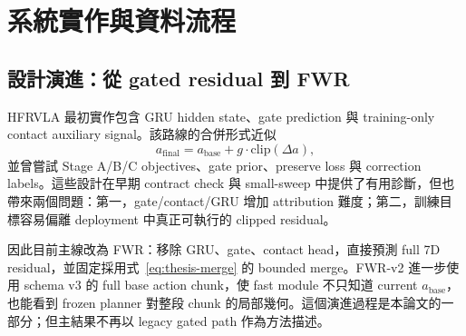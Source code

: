 \documentclass[12pt,a4paper,oneside]{report}
\newcommand{\abase}{a_{\mathrm{base}}}
\newcommand{\clip}{\mathrm{clip}}
\begin{document}
\chapter{系統實作與資料流程}
\label{chap:implementation}

\section{設計演進：從 gated residual 到 FWR}

HFRVLA 最初實作包含 GRU hidden state、gate prediction 與 training-only contact auxiliary signal。該路線的合併形式近似
\begin{equation}
  a_{\mathrm{final}}=\abase+g\cdot\clip(\Delta a),
\end{equation}
並曾嘗試 Stage A/B/C objectives、gate prior、preserve loss 與 correction labels。這些設計在早期 contract check 與 small-sweep 中提供了有用診斷，但也帶來兩個問題：第一，gate/contact/GRU 增加 attribution 難度；第二，訓練目標容易偏離 deployment 中真正可執行的 clipped residual。

因此目前主線改為 FWR：移除 GRU、gate、contact head，直接預測 full 7D residual，並固定採用式~\ref{eq:thesis-merge} 的 bounded merge。FWR-v2 進一步使用 schema v3 的 full base action chunk，使 fast module 不只知道 current $\abase$，也能看到 frozen planner 對整段 chunk 的局部幾何。這個演進過程是本論文的一部分；但主結果不再以 legacy gated path 作為方法描述。
\end{document}

